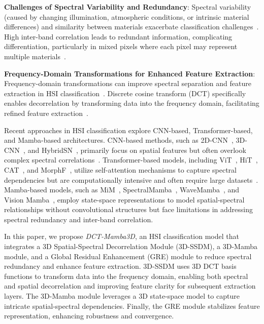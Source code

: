 \textbf{Challenges of Spectral Variability and Redundancy}: Spectral variability (caused by changing illumination, atmospheric conditions, or intrinsic material differences) and similarity between materials exacerbate classification challenges~\cite{theiler2019spectral, yao2024spectralmamba, hong2024spectralgpt}. High inter-band correlation leads to redundant information, complicating differentiation, particularly in mixed pixels where each pixel may represent multiple materials~\cite{be2014tgrs}.

\textbf{Frequency-Domain Transformations for Enhanced Feature Extraction}: Frequency-domain transformations can improve spectral separation and feature extraction in HSI classification~\cite{yan2024exploiting, qiao2023dual}. Discrete cosine transform (DCT) specifically enables decorrelation by transforming data into the frequency domain, facilitating refined feature extraction~\cite{shen2021dct, ulicny2022harmonic, xu2020learning, ulicny2019harmonic}.

Recent approaches in HSI classification explore CNN-based, Transformer-based, and Mamba-based architectures. CNN-based methods, such as 2D-CNN~\cite{yang2018hyperspectral}, 3D-CNN~\cite{yang2020synergistic}, and HybridSN~\cite{roy2019hybridsn}, primarily focus on spatial features but often overlook complex spectral correlations~\cite{chen2016deep, Jia2022tgrs, ulicny2022harmonic, Xu2023grsl}. Transformer-based models, including ViT~\cite{dosovitskiy2020image}, HiT~\cite{yang2022hyperspectral}, CAT~\cite{feng2024cat}, and MorphF~\cite{roy2023spectral}, utilize self-attention mechanisms to capture spectral dependencies but are computationally intensive and often require large datasets~\cite{scheibenreif2023masked, feng2024cat}. Mamba-based models, such as MiM~\cite{zhou2024mamba}, SpectralMamba~\cite{yao2024spectralmamba}, WaveMamba~\cite{ahmad2024wavemamba}, and Vision Mamba~\cite{zhu2024vision}, employ state-space representations to model spatial-spectral relationships without convolutional structures but face limitations in addressing spectral redundancy and inter-band correlation.

In this paper, we propose \textit{DCT-Mamba3D}, an HSI classification model that integrates a 3D Spatial-Spectral Decorrelation Module (3D-SSDM), a 3D-Mamba module, and a Global Residual Enhancement (GRE) module to reduce spectral redundancy and enhance feature extraction. 3D-SSDM uses 3D DCT basis functions to transform data into the frequency domain, enabling both spectral and spatial decorrelation and improving feature clarity for subsequent extraction layers. The 3D-Mamba module leverages a 3D state-space model to capture intricate spatial-spectral dependencies. Finally, the GRE module stabilizes feature representation, enhancing robustness and convergence.

